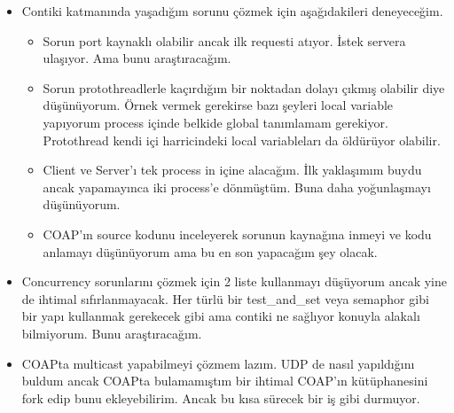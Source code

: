 \documentclass{article}
\begin{document}
\begin{itemize}
\item Contiki katmanında yaşadığım sorunu çözmek için aşağıdakileri deneyeceğim.
\begin{itemize}
\item Sorun port kaynaklı olabilir ancak ilk requesti atıyor. İstek servera ulaşıyor. Ama bunu araştıracağım.
\item Sorun protothreadlerle kaçırdığım bir noktadan dolayı çıkmış olabilir diye düşünüyorum. Örnek vermek gerekirse bazı şeyleri local variable yapıyorum process içinde belkide global tanımlamam gerekiyor. Protothread kendi  içi harricindeki local variableları da öldürüyor olabilir.
\item Client ve Server'ı tek process in içine alacağım. İlk yaklaşımım buydu ancak yapamayınca iki process'e dönmüştüm. Buna daha yoğunlaşmayı düşünüyorum.
\item COAP'ın source kodunu inceleyerek sorunun kaynağına inmeyi ve kodu anlamayı düşünüyorum ama bu en son yapacağım şey olacak.
\end{itemize}
\item Concurrency sorunlarını çözmek için 2 liste kullanmayı düşüyorum ancak yine de ihtimal sıfırlanmayacak. Her türlü bir test_and_set veya semaphor gibi bir yapı kullanmak gerekecek gibi ama contiki ne sağlıyor konuyla alakalı bilmiyorum. Bunu araştıracağım.
\item COAPta multicast yapabilmeyi çözmem lazım. UDP de nasıl yapıldığını buldum ancak COAPta bulamamıştım bir ihtimal COAP'ın kütüphanesini fork edip bunu ekleyebilirim. Ancak bu kısa sürecek bir iş gibi durmuyor.

\end{itemize}
\end{document}
